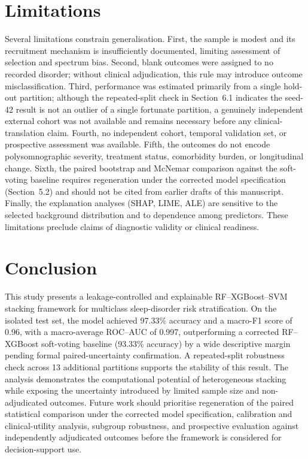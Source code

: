 \documentclass{elektr}
\begin{document}
\section{Limitations}
Several limitations constrain generalisation. First, the sample is modest and its recruitment mechanism is insufficiently documented, limiting assessment of selection and spectrum bias. Second, blank outcomes were assigned to no recorded disorder; without clinical adjudication, this rule may introduce outcome misclassification. Third, performance was estimated primarily from a single hold-out partition; although the repeated-split check in Section~6.1 indicates the seed-42 result is not an outlier of a single fortunate partition, a genuinely independent external cohort was not available and remains necessary before any clinical-translation claim. Fourth, no independent cohort, temporal validation set, or prospective assessment was available. Fifth, the outcomes do not encode polysomnographic severity, treatment status, comorbidity burden, or longitudinal change. Sixth, the paired bootstrap and McNemar comparison against the soft-voting baseline requires regeneration under the corrected model specification (Section~5.2) and should not be cited from earlier drafts of this manuscript. Finally, the explanation analyses (SHAP, LIME, ALE) are sensitive to the selected background distribution and to dependence among predictors. These limitations preclude claims of diagnostic validity or clinical readiness.

\FloatBarrier
\section{Conclusion}
This study presents a leakage-controlled and explainable RF--XGBoost--SVM stacking framework for multiclass sleep-disorder risk stratification. On the isolated test set, the model achieved 97.33\% accuracy and a macro-F1 score of 0.96, with a macro-average ROC--AUC of 0.997, outperforming a corrected RF--XGBoost soft-voting baseline (93.33\% accuracy) by a wide descriptive margin pending formal paired-uncertainty confirmation. A repeated-split robustness check across 13 additional partitions supports the stability of this result. The analysis demonstrates the computational potential of heterogeneous stacking while exposing the uncertainty introduced by limited sample size and non-adjudicated outcomes. Future work should prioritise regeneration of the paired statistical comparison under the corrected model specification, calibration and clinical-utility analysis, subgroup robustness, and prospective evaluation against independently adjudicated outcomes before the framework is considered for decision-support use.
\end{document}
